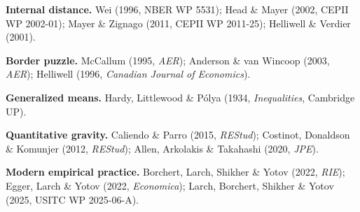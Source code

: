 \documentclass[11pt,letterpaper,oneside]{book}
\theoremstyle{definition}
\theoremstyle{remark}
\begin{document}
\textbf{Internal distance.}
Wei (1996, NBER WP 5531);
Head \& Mayer (2002, CEPII WP 2002-01);
Mayer \& Zignago (2011, CEPII WP 2011-25);
Helliwell \& Verdier (2001).

\textbf{Border puzzle.}
McCallum (1995, \emph{AER});
Anderson \& van Wincoop (2003, \emph{AER});
Helliwell (1996, \emph{Canadian Journal of Economics}).

\textbf{Generalized means.}
Hardy, Littlewood \& P\'olya (1934, \emph{Inequalities}, Cambridge UP).

\textbf{Quantitative gravity.}
Caliendo \& Parro (2015, \emph{REStud});
Costinot, Donaldson \& Komunjer (2012, \emph{REStud});
Allen, Arkolakis \& Takahashi (2020, \emph{JPE}).

\textbf{Modern empirical practice.}
Borchert, Larch, Shikher \& Yotov (2022, \emph{RIE});
Egger, Larch \& Yotov (2022, \emph{Economica});
Larch, Borchert, Shikher \& Yotov (2025, USITC WP 2025-06-A).
\end{document}
